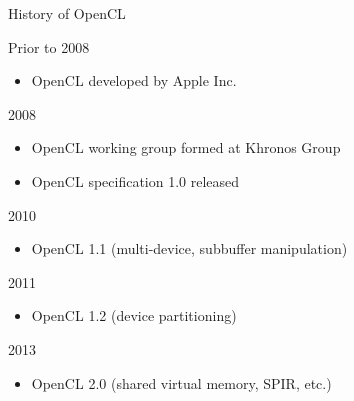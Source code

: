 
\begin{frame}{History of OpenCL}

\begin{minipage}{0.7\textwidth}
\begin{block}{Prior to 2008}
  \begin{itemize}
   \item OpenCL developed by Apple Inc.
  \end{itemize}
\end{block}

\begin{block}{2008}
  \begin{itemize}
   \item OpenCL working group formed at Khronos Group
   \item OpenCL specification 1.0 released
  \end{itemize}
\end{block}

\begin{block}{2010}
  \begin{itemize}
   \item OpenCL 1.1 (multi-device, subbuffer manipulation)
  \end{itemize}
\end{block}

\begin{block}{2011}
  \begin{itemize}
   \item OpenCL 1.2 (device partitioning)
  \end{itemize}
\end{block}

\begin{block}{2013}
  \begin{itemize}
   \item OpenCL 2.0 (shared virtual memory, SPIR, etc.)
  \end{itemize}
\end{block}


\end{minipage}
\end{frame}
